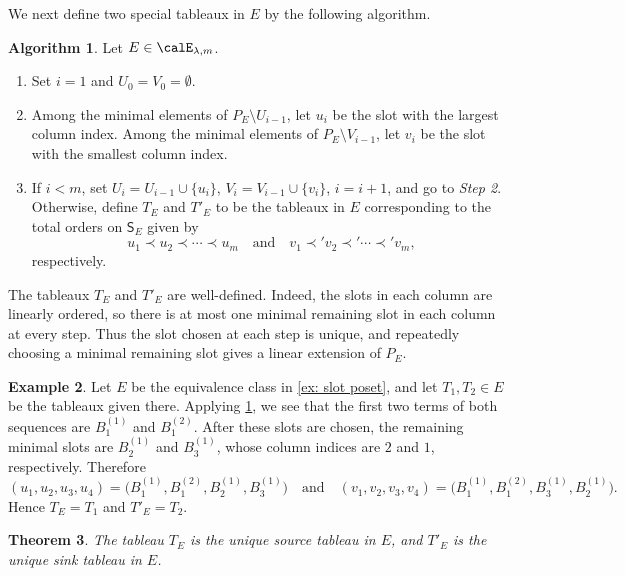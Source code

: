 \documentclass[12pt, reqno]{amsart}
\numberwithin{equation}{section}
\numberwithin{figure}{section}
\numberwithin{table}{section}
\newtheorem{theorem}{Theorem}[section]
\theoremstyle{definition}
\newtheorem{algorithm}[theorem]{Algorithm}
\newtheorem{example}[theorem]{Example}
\begin{document}
We next define two special tableaux in $E$ by the following algorithm.
\begin{algorithm}\label{alg: extremal tableaux}
Let $E \in \calE_{\lambda,m}$.
\begin{enumerate}[label = {\it Step {\rm \arabic*:}}]
\item 
Set $i = 1$ and $U_0 = V_0 = \emptyset$.
\item
Among the minimal elements of $P_E \setminus U_{i-1}$, let $u_i$ be the slot with the largest column index.
Among the minimal elements of $P_E \setminus V_{i-1}$, let $v_i$ be the slot with the smallest column index.
\item
If $i < m$, set $U_{i} = U_{i-1} \cup \{u_i\}$, $V_{i} = V_{i-1} \cup \{v_i\}$, $i = i+1$, and go to {\it Step 2}.
Otherwise, define $T_E$ and $T'_E$ to be the tableaux in $E$ corresponding to the total orders on $\mathsf{S}_E$ given by
\[
u_1 \prec u_2 \prec \cdots \prec u_m
\quad\text{and}\quad
v_1 \prec' v_2 \prec' \cdots \prec' v_m,
\]
respectively.
\end{enumerate}
\end{algorithm}


The tableaux $T_E$ and $T'_E$ are well-defined.
Indeed, the slots in each column are linearly ordered, so there is at most one minimal remaining slot in each column at every step.
Thus the slot chosen at each step is unique, and repeatedly choosing a minimal remaining slot gives a linear extension of $P_E$.


\begin{example}\label{ex: extremal tableaux}
Let $E$ be the equivalence class in \cref{ex: slot poset}, and let $T_1,T_2 \in E$ be the tableaux given there.
Applying \cref{alg: extremal tableaux}, we see that the first two terms of both sequences are $B_1^{(1)}$ and $B_1^{(2)}$.
After these slots are chosen, the remaining minimal slots are $B_2^{(1)}$ and $B_3^{(1)}$, whose column indices are $2$ and $1$, respectively.
Therefore
\[
(u_1,u_2,u_3,u_4)
=\bigl(B_1^{(1)},B_1^{(2)},B_2^{(1)},B_3^{(1)}\bigr)
\quad\text{and}\quad
(v_1,v_2,v_3,v_4)
=\bigl(B_1^{(1)},B_1^{(2)},B_3^{(1)},B_2^{(1)}\bigr).
\]
Hence $T_E=T_1$ and $T'_E=T_2$.
\end{example}




\begin{theorem}\label{thm: unique source sink}
The tableau $T_E$ is the unique source tableau in $E$, and $T'_E$ is the unique sink tableau in $E$.
\end{theorem}
\end{document}
